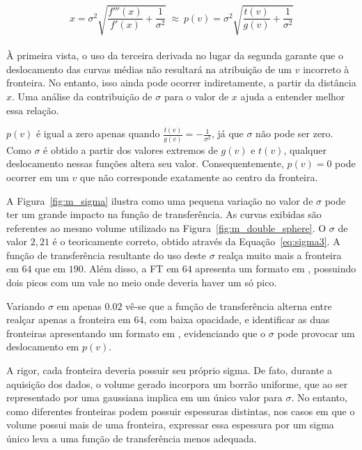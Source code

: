\begin{equation} \label{eq:x3}
	x = \sigma^{2}\sqrt{\frac{f'''(x)}{f'(x)} + \frac{1}{\sigma^{2}}} \ \approx \ 
	p(v) = \sigma^{2}\sqrt{\frac{t(v)}{g(v)} + \frac{1}{\sigma^{2}}}
\end{equation} \\

	À primeira vista, o uso da terceira derivada no lugar da segunda garante que o deslocamento das curvas médias não resultará na atribuição de um $ v $ incorreto à fronteira. No entanto, isso ainda pode ocorrer indiretamente, a partir da distância $ x $. Uma análise da contribuição de $ \sigma $ para o valor de $ x $ ajuda a entender melhor essa relação.
	
	$ p(v) $ é igual a zero apenas quando $ \frac{t(v)}{g(v)} = -\frac{1}{\sigma^{2}} $, já que $ \sigma $ não pode ser zero. Como $ \sigma $ é obtido a partir dos valores extremos de $ g(v) $ e $ t(v) $, qualquer deslocamento nessas funções altera seu valor. Consequentemente, $ p(v) = 0 $ pode ocorrer em um $ v $ que não corresponde exatamente ao centro da fronteira. 
	
	A Figura~\ref{fig:m_sigma} ilustra como uma pequena variação no valor de $ \sigma $ pode ter um grande impacto na função de transferência. As curvas exibidas são referentes ao mesmo volume utilizado na Figura~\ref{fig:m_double_sphere}. O $ \sigma $ de valor $ 2,21 $ é o teoricamente correto, obtido através da Equação~\eqref{eq:sigma3}. A função de transferência resultante do uso deste $ \sigma $ realça muito mais a fronteira em $ 64 $ que em $ 190 $. Além disso, a FT em $ 64 $ apresenta um formato em , possuindo dois picos com um vale no meio onde deveria haver um só pico.
	
	Variando $ \sigma $ em apenas $ 0.02 $ vê-se que a função de transferência alterna entre realçar apenas a fronteira em $ 64 $, com baixa opacidade, e identificar as duas fronteiras apresentando um formato em , evidenciando que o $ \sigma $ pode provocar um deslocamento em $ p(v) $.
	
	A rigor, cada fronteira deveria possuir seu próprio sigma. De fato, durante a aquisição dos dados, o volume gerado incorpora um borrão uniforme, que ao ser representado por uma gaussiana implica em um único valor para $ \sigma $. No entanto, como diferentes fronteiras podem possuir espessuras distintas, nos casos em que o volume possui mais de uma fronteira, expressar essa espessura por um sigma único leva a uma função de transferência menos adequada.
	
